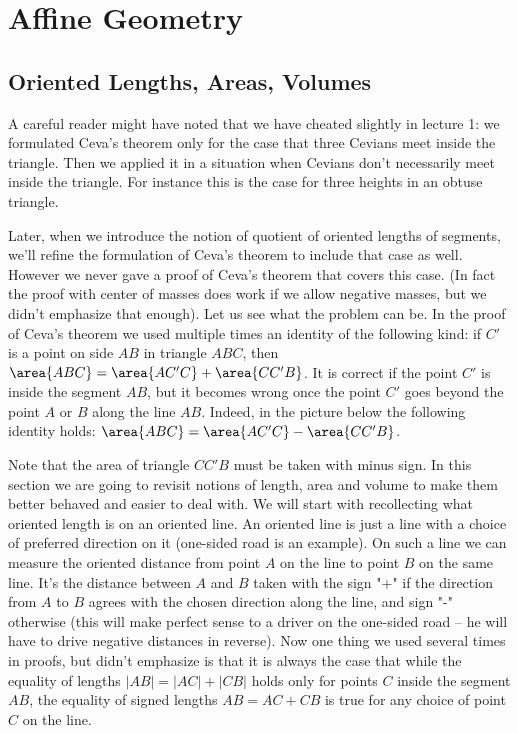 \chapter{Affine Geometry}
\section{Oriented Lengths, Areas, Volumes}
A careful reader might have noted that we have cheated slightly in lecture 1: we formulated Ceva's theorem only for the case that three Cevians meet inside the triangle. Then we applied it in a situation when Cevians don't necessarily meet inside the triangle. For instance this is the case for three heights in an obtuse triangle.

Later, when we introduce the notion of quotient of oriented lengths of segments, we'll refine the formulation of Ceva's theorem to include that case as well. However we never gave a proof of Ceva's theorem that covers this case. (In fact the proof with center of masses does work if we allow negative masses, but we didn't emphasize that enough). Let us see what the problem can be. In the proof of Ceva's theorem we used multiple times an identity of the following kind: if $C'$ is a point on side $AB$ in triangle $ABC$, then $\area{ABC}=\area{AC'C}+\area{CC'B}$. It is correct if the point $C'$ is inside the segment $AB$, but it becomes wrong once the point $C'$ goes beyond the point $A$ or $B$ along the line $AB$. Indeed, in the picture below the following identity holds: $\area{ABC}=\area{AC'C}-\area{CC'B}$.

Note that the area of triangle $CC'B$ must be taken with minus sign. In this section we are going to revisit notions of length, area and volume to make them better behaved and easier to deal with.
We will start with recollecting what oriented length is on an oriented line. An oriented line is just a line with a choice of preferred direction on it (one-sided road is an example). On such a line we can measure the oriented distance from point $A$ on the line to point $B$ on the same line. It's the distance between $A$ and $B$ taken with the sign "+" if the direction from $A$ to $B$ agrees with the chosen direction along the line, and sign "-" otherwise (this will make perfect sense to a driver on the one-sided road -- he will have to drive negative distances in reverse). Now one thing we used several times in proofs, but didn't emphasize is that it is always the case that while the equality of lengths $|AB|=|AC|+|CB|$ holds only for points $C$ inside the segment $AB$, the equality of signed lengths $AB=AC+CB$ is true for any choice of point $C$ on the line.
